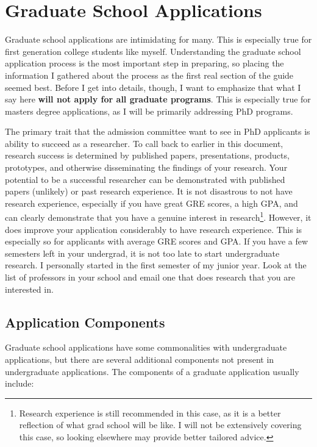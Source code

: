 \documentclass[12pt]{article}
\begin{document}
\section{Graduate School Applications}

Graduate school applications are intimidating for many. This is especially true for first generation college students like myself. Understanding the graduate school application process is the most important step in preparing, so placing the information I gathered about the process as the first real section of the guide seemed best. Before I get into details, though, I want to emphasize that what I say here \textbf{will not apply for all graduate programs}. This is especially true for masters degree applications, as I will be primarily addressing PhD programs.

The primary trait that the admission committee want to see in PhD applicants is ability to succeed as a researcher. To call back to earlier in this document, research success is determined by published papers, presentations, products, prototypes, and otherwise disseminating the findings of your research. Your potential to be a successful researcher can be demonstrated with published papers (unlikely) or past research experience. It is not disastrous to not have research experience, especially if you have great GRE scores, a high GPA, and can clearly demonstrate that you have a genuine interest in research\footnote{Research experience is still recommended in this case, as it is a better reflection of what grad school will be like. I will not be extensively covering this case, so looking elsewhere may provide better tailored advice.}. However, it does improve your application considerably to have research experience. This is especially so for applicants with average GRE scores and GPA. If you have a few semesters left in your undergrad, it is not too late to start undergraduate research. I personally started in the first semester of my junior year. Look at the list of professors in your school and email one that does research that you are interested in.

\subsection{Application Components}

Graduate school applications have some commonalities with undergraduate applications, but there are several additional components not present in undergraduate applications. The components of a graduate application usually include:
\end{document}
